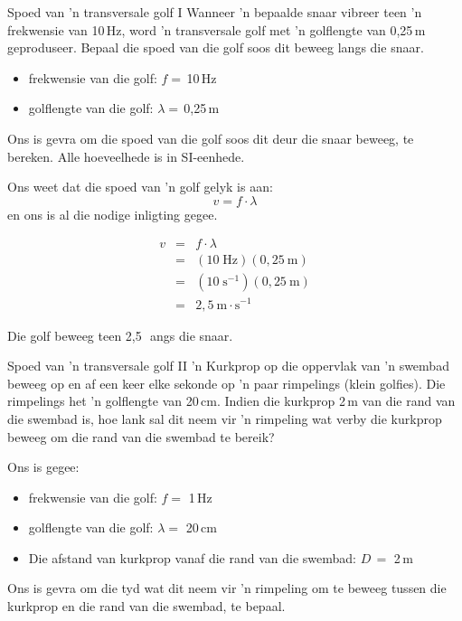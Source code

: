 \begin{definition}

\begin{wex}{Spoed van 'n transversale golf I }{Wanneer 'n bepaalde snaar vibreer teen 'n frekwensie van 10\,Hz, word 'n transversale golf met  'n 
      golflengte van 0,25\,m geproduseer. Bepaal die spoed van die golf soos dit beweeg langs
      die snaar.}
{
\begin{itemize}
\item{frekwensie van die golf: $f=$\,10\,Hz}
\item{golflengte van die golf: $\lambda=$\,0,25\,m}
\end{itemize}
Ons is gevra om die spoed van die golf soos dit deur die snaar beweeg, te bereken. Alle
      hoeveelhede is in SI-eenhede.

Ons weet dat die spoed van 'n golf gelyk is aan:
\begin{equation*}
v=f\cdot \lambda 
\end{equation*}
en ons is al die nodige inligting gegee.

\begin{eqnarray*}
v&=&f\cdot \lambda\\
&=&(10\;\text{Hz})(0,25~\text{m})\\
&=&(10\;\text{s}^{-1})(0,25~\text{m})\\
&=&2,5~\text{m} \cdot \text{s}^{-1}
\end{eqnarray*}

Die golf beweeg teen 2,5\,\ms\ angs die snaar.
}
\end{wex}


\begin{wex}{Spoed van 'n transversale golf II}{ 'n Kurkprop op die oppervlak van 'n swembad beweeg op en af ​​een keer elke sekonde op
     'n paar rimpelings (klein golfies). Die rimpelings het 'n golflengte van  20\,cm. Indien die kurkprop 2\,m van die
    rand van die swembad is, hoe lank sal dit neem vir  'n rimpeling wat verby die kurkprop beweeg om die rand
    van die swembad te bereik?}{
Ons is gegee:
\begin{itemize}
\item{frekwensie van die golf: $f =$ 1\,Hz}
\item{golflengte van die golf: $\lambda =$ 20\,cm}
\item{Die afstand van kurkprop vanaf die rand van die swembad:  $D\,=$ 2\,m}
\end{itemize}
Ons is gevra om die tyd wat dit neem vir 'n rimpeling om te beweeg tussen die kurkprop
    en die rand van die swembad, te bepaal.

}
\end{wex}
\end{definition}

